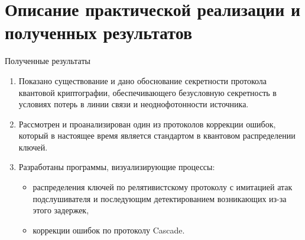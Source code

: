 \documentclass[aspectratio=43, handout, notes=only]{beamer}
\begin{document}
\section{Описание практической реализации и полученных результатов}
 \begin{frame}{Полученные результаты}
   \begin{enumerate}
     \item Показано существование и дано обоснование секретности протокола квантовой криптографии, обеспечивающего безусловную секретность в условиях потерь в линии связи и неоднофотонности источника.
      \item Рассмотрен и проанализирован один из протоколов коррекции ошибок, который в настоящее время является стандартом в квантовом распределении ключей.
\item Разработаны программы, визуализирующие процессы:
\begin{itemize}
  \item распределения ключей по релятивистскому протоколу с имитацией атак подслушивателя и последующим детектированием возникающих из-за этого задержек,
  \item коррекции ошибок по протоколу Cascade.
\end{itemize}
   \end{enumerate}
 \end{frame}
 



\maketitle
\end{document}
